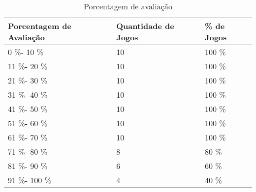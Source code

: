 \begin{table}
\centering
\begin{tabular}{|p{5cm}|p{5cm}|p{5cm}|}
\hline \textbf{Porcentagem de Avaliação} & \textbf{Quantidade de Jogos} & \textbf{\% de Jogos} \\
\hline 0 \%- 10 \% & 10 & 100 \% \\
\hline 11 \%- 20 \% & 10 & 100 \% \\
\hline 21 \%- 30 \% & 10 & 100 \% \\
\hline 31 \%- 40 \% & 10 & 100 \% \\
\hline 41 \%- 50 \% & 10 & 100 \% \\
\hline 51 \%- 60 \% & 10 & 100 \% \\
\hline 61 \%- 70 \% & 10 & 100 \% \\
\hline 71 \%- 80 \% & 8 & 80 \% \\
\hline 81 \%- 90 \% & 6 & 60 \% \\
\hline 91 \%- 100 \% & 4 & 40 \% \\
\hline
\end{tabular}
\caption{Porcentagem de avaliação}
\label{table:avaliacao}
\end{table}